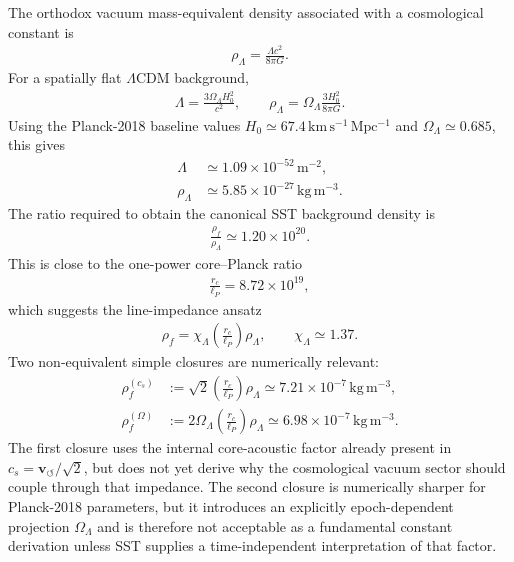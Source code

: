 The orthodox vacuum mass-equivalent density associated with a cosmological
constant is
\begin{align}
    \rho_\Lambda
    =
    \frac{\Lambda c^2}{8\pi G} .
\end{align}
For a spatially flat \(\Lambda\)CDM background,
\begin{align}
    \Lambda
    =
    \frac{3\Omega_\Lambda H_0^2}{c^2},
    \qquad
    \rho_\Lambda
    =
    \Omega_\Lambda\frac{3H_0^2}{8\pi G} .
\end{align}
Using the Planck-2018 baseline values
\(H_0\simeq 67.4\,\mathrm{km\,s^{-1}\,Mpc^{-1}}\) and
\(\Omega_\Lambda\simeq0.685\), this gives
\begin{align}
    \Lambda &\simeq 1.09\times10^{-52}\,\mathrm{m^{-2}},\\
    \rho_\Lambda &\simeq 5.85\times10^{-27}\,\mathrm{kg\,m^{-3}} .
\end{align}
The ratio required to obtain the canonical SST background density is
\begin{align}
    \frac{\rho_{\!f}}{\rho_\Lambda}
    \simeq
    1.20\times10^{20} .
\end{align}
This is close to the one-power core--Planck ratio
\begin{align}
    \frac{r_c}{\ell_P}
    =
    8.72\times10^{19},
\end{align}
which suggests the line-impedance ansatz
\begin{align}
    \rho_{\!f}
    =
    \chi_\Lambda
    \left(\frac{r_c}{\ell_P}\right)
    \rho_\Lambda,
    \qquad
    \chi_\Lambda
    \simeq
    1.37 .
    \label{eq:rt_rhof_lambda_chi}
\end{align}
Two non-equivalent simple closures are numerically relevant:
\begin{align}
    \rho_{\!f}^{(c_s)}
    &:=
    \sqrt{2}
    \left(\frac{r_c}{\ell_P}\right)
    \rho_\Lambda
    \simeq
    7.21\times10^{-7}\,\mathrm{kg\,m^{-3}},
    \\
    \rho_{\!f}^{(\Omega)}
    &:=
    2\Omega_\Lambda
    \left(\frac{r_c}{\ell_P}\right)
    \rho_\Lambda
    \simeq
    6.98\times10^{-7}\,\mathrm{kg\,m^{-3}} .
\end{align}
The first closure uses the internal core-acoustic factor already present in
\(c_s=\mathbf{v}_{\!\boldsymbol{\circlearrowleft}}/\sqrt{2}\), but does not yet
derive why the cosmological vacuum sector should couple through that
impedance. The second closure is numerically sharper for Planck-2018
parameters, but it introduces an explicitly epoch-dependent projection
\(\Omega_\Lambda\) and is therefore not acceptable as a fundamental
constant derivation unless SST supplies a time-independent interpretation of
that factor.

